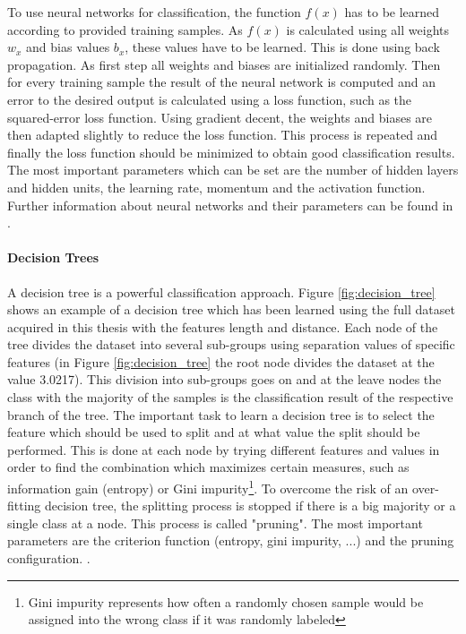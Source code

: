 To use neural networks for classification, the function $f(x)$ has to be learned according to provided training samples. As $f(x)$ is calculated using all weights $w_x$ and bias values $b_x$, these values have to be learned. This is done using back propagation. As first step all weights and biases are initialized randomly. Then for every training sample the result of the neural network is computed and an error to the desired output is calculated using a loss function, such as the squared-error loss function. Using gradient decent, the weights and biases are then adapted slightly to reduce the loss function. This process is repeated and finally the loss function should be minimized to obtain good classification results. The most important parameters which can be set are the number of hidden layers and hidden units, the learning rate, momentum and the activation function. Further information about neural networks and their parameters can be found in \cite{Hall2016_DataMining_ML}.







\paragraph{Decision Trees}

A decision tree is a powerful classification approach. Figure \ref{fig:decision_tree} shows an example of a decision tree which has been learned using the full dataset acquired in this thesis with the features length and distance. Each node of the tree divides the dataset into several sub-groups using separation values of specific features (in Figure \ref{fig:decision_tree} the root node divides the dataset at the value 3.0217). This division into sub-groups goes on and at the leave nodes the class with the majority of the samples is the classification result of the respective branch of the tree. The important task to learn a decision tree is to select the feature which should be used to split and at what value the split should be performed. This is done at each node by trying different features and values in order to find the combination which maximizes certain measures, such as information gain (entropy) or Gini impurity\footnote{Gini impurity represents how often a randomly chosen sample would be assigned into the wrong class if it was randomly labeled}. To overcome the risk of an over-fitting decision tree, the splitting process is stopped if there is a big majority or a single class at a node. This process is called "pruning". The most important parameters are the criterion function (entropy, gini impurity, ...) and the pruning configuration. \cite{Hall2016_DataMining_ML}.

